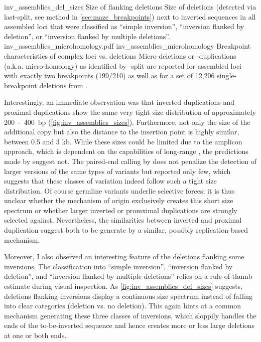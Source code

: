     {inv_assemblies_del_sizes}
    {Size of flanking deletions}
    {Size of deletions (detected via \acs{last}-split, see method in
    \cref{sec:maze_breakpoints}) next to inverted sequences in all assembled
    loci that were classified as ``simple inversion'', ``inversion flanked by
    deletion'', or ``inversion flanked by multiple deletions''.}
        {inv_assemblies_microhomology.pdf}
    {inv_assemblies_microhomology}
    {Breakpoint characteristics of complex loci vs. deletions}
    {Micro-deletions or -duplications (a.k.a. micro-homology) as identified by
    \last-split are reported for assembled loci with exactly two breakpoints
    (199/210) as well as for a set of 12,206 single-breakpoint deletions from
    \cite{Sudmant2015}.}

Interestingly, an immediate observation was that inverted duplications and
proximal duplications show the same very tight size distribution of
approximately 200~-~400~bp (\cref{fig:inv_assemblies_sizes}). Furthermore, not
only the size of the
additional copy but also the distance to the insertion point is highly similar,
between 0.5 and 3 kb. While these sizes could be limited due to the amplicon
approach, which is dependent on the capabilities of long-range \pcr, the
predictions made by \delly suggest not. The paired-end calling by \delly does
not penalize the detection of larger versions of the same types of variants but
reported only few, which suggests that these classes of variation indeed follow
such a tight size distribution. Of course germline variants underlie selective
forces; it is thus unclear whether the mechanism of origin exclusively creates
this short size spectrum or whether larger inverted or promximal duplications
are strongly selected against. Nevertheless, the similarities between inverted
and proximal duplication suggest both to be generate by a similar, possibly
replication-based mechanism.

Moreover, I also observed an interesting feature of the deletions flanking some
inversions. The classification into ``simple inversion'', ``inversion flanked by
deletion'', and ``inversion flanked by multiple deletions'' relies on a
rule-of-thumb estimate during visual inspection. As
\cref{fig:inv_assemblies_del_sizes} suggests, deletions flanking inversions
display a continuous size spectrum instead of falling into clear categories
(deletion vs. no deletion). This again hints at a common mechanism generating
these three classes of inversions, which sloppily handles the ends of the
to-be-inverted sequence and hence creates more or less large deletions at one
or both ends.



